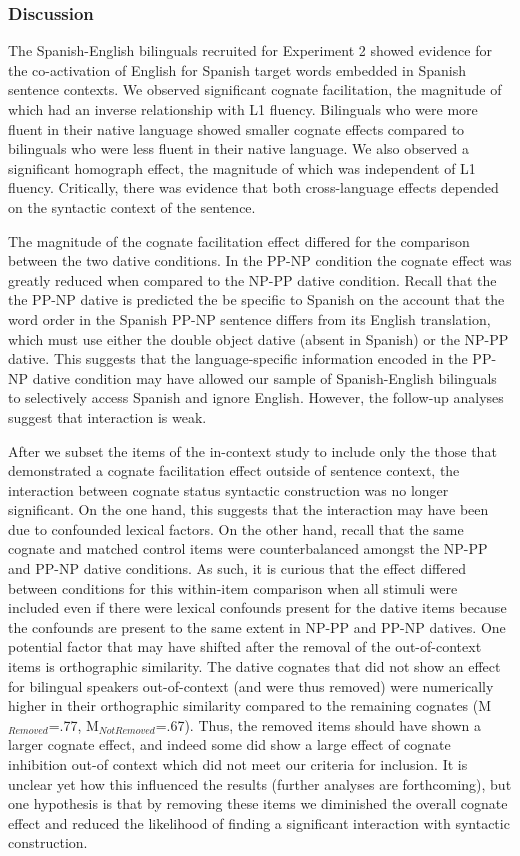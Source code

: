 \subsubsection{Discussion}
\label{discussion}

The Spanish-English bilinguals recruited for Experiment 2 showed evidence for the co-activation of English for Spanish target words embedded in Spanish sentence contexts. We observed significant cognate facilitation, the magnitude of which had an inverse relationship with L1 fluency. Bilinguals who were more fluent in their native language showed smaller cognate effects compared to bilinguals who were less fluent in their native language. We also observed a significant homograph effect, the magnitude of which was independent of L1 fluency. Critically, there was evidence that both cross-language effects depended on the syntactic context of the sentence. 

The magnitude of the cognate facilitation effect differed for the comparison between the two dative conditions. In the PP-NP condition the cognate effect was greatly reduced when compared to the NP-PP dative condition. Recall that the the PP-NP dative is predicted the be specific to Spanish on the account that the word order in the Spanish PP-NP sentence differs from its English translation, which must use either the double object dative (absent in Spanish) or the NP-PP dative. This suggests that the language-specific information encoded in the PP-NP dative condition may have allowed our sample of Spanish-English bilinguals to selectively access Spanish and ignore English. However, the follow-up analyses suggest that interaction is weak.

After we subset the items of the in-context study to include only the those that demonstrated a cognate facilitation effect outside of sentence context, the interaction between cognate status syntactic construction was no longer significant. On the one hand, this suggests that the interaction may have been due to confounded lexical factors. On the other hand, recall that the same cognate and matched control items were counterbalanced amongst the NP-PP and PP-NP dative conditions. As such, it is curious that the effect differed between conditions for this within-item comparison when all stimuli were included even if there were lexical confounds present for the dative items because the confounds are present to the same extent in NP-PP and PP-NP datives. One potential factor that may have shifted after the removal of the out-of-context items is orthographic similarity. The dative cognates that did not show an effect for bilingual speakers out-of-context (and were thus removed) were numerically higher in their orthographic similarity compared to the remaining cognates (M$_{Removed}$=.77, M$_{Not Removed}$=.67). Thus, the removed items should have shown a larger cognate effect, and indeed some did show a large effect of cognate inhibition out-of context which did not meet our criteria for inclusion. It is unclear yet how this influenced the results (further analyses are forthcoming), but one hypothesis is that by removing these items we diminished the overall cognate effect and reduced the likelihood of finding a significant interaction with syntactic construction. 

